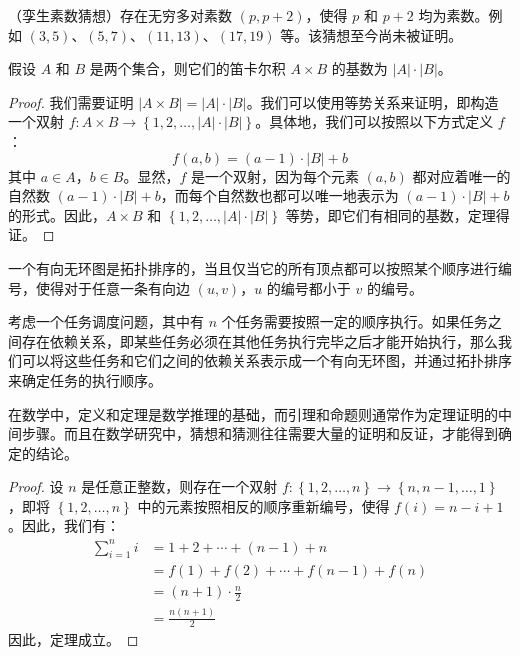 \begin{conj}
  （孪生素数猜想）存在无穷多对素数 $(p, p+2)$，使得 $p$ 和 $p+2$ 均为素数。例如 $(3,5)$、$(5,7)$、$(11,13)$、$(17,19)$ 等。该猜想至今尚未被证明。
\end{conj}

\begin{assume}
  假设 $A$ 和 $B$ 是两个集合，则它们的笛卡尔积 $A \times B$ 的基数为 $|A| \cdot |B|$。
\end{assume}

\begin{proof}
  我们需要证明 $|A \times B| = |A| \cdot |B|$。我们可以使用等势关系来证明，即构造一个双射 $f: A \times B \rightarrow \left\{1,2,\dots,|A| \cdot |B|\right\}$。具体地，我们可以按照以下方式定义 $f$：
  \begin{equation}
    f(a,b)=(a-1)\cdot |B|+b
  \end{equation}
  其中 $a \in A$，$b \in B$。显然，$f$ 是一个双射，因为每个元素 $(a,b)$ 都对应着唯一的自然数 $(a-1) \cdot |B| + b$，而每个自然数也都可以唯一地表示为 $(a-1) \cdot |B| + b$ 的形式。因此，$A \times B$ 和 $\left\{1,2,\dots,|A| \cdot |B|\right\}$ 等势，即它们有相同的基数，定理得证。
\end{proof}

\begin{dfn}
  一个有向无环图是拓扑排序的，当且仅当它的所有顶点都可以按照某个顺序进行编号，使得对于任意一条有向边 $(u,v)$，$u$ 的编号都小于 $v$ 的编号。
\end{dfn}

\begin{exmp}
  考虑一个任务调度问题，其中有 $n$ 个任务需要按照一定的顺序执行。如果任务之间存在依赖关系，即某些任务必须在其他任务执行完毕之后才能开始执行，那么我们可以将这些任务和它们之间的依赖关系表示成一个有向无环图，并通过拓扑排序来确定任务的执行顺序。
\end{exmp}

\begin{rem}
  在数学中，定义和定理是数学推理的基础，而引理和命题则通常作为定理证明的中间步骤。而且在数学研究中，猜想和猜测往往需要大量的证明和反证，才能得到确定的结论。
\end{rem}

\begin{proof}
  设 $n$ 是任意正整数，则存在一个双射 $f: \left\{1,2,\dots,n\right\} \rightarrow \left\{n,n-1,\dots,1\right\}$，即将 $\left\{1,2,\dots,n\right\}$ 中的元素按照相反的顺序重新编号，使得 $f(i) = n-i+1$。因此，我们有：
  \begin{align*}
    \sum_{i=1}^n i & = 1 + 2 + \cdots + (n-1) + n           \\
                   & = f(1) + f(2) + \cdots + f(n-1) + f(n) \\
                   & = (n+1) \cdot \frac{n}{2}              \\
                   & = \frac{n(n+1)}{2}
  \end{align*}
  因此，定理成立。
\end{proof}

